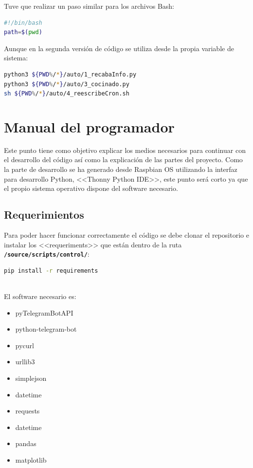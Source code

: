 Tuve que realizar un paso similar para los archivos Bash:
\begin{lstlisting}[language=sh, firstnumber=0, basicstyle=\small, caption={Obtención de rutas en Bash scripting.}]
#!/bin/bash
path=$(pwd)
\end{lstlisting}
Aunque en la segunda versión de código se utiliza desde la propia variable de sistema:

\begin{lstlisting}[language=sh, firstnumber=0, basicstyle=\small, caption={Utilización de las variables de sistema en Bash.}]
python3 ${PWD%/*}/auto/1_recabaInfo.py
python3 ${PWD%/*}/auto/3_cocinado.py
sh ${PWD%/*}/auto/4_reescribeCron.sh
\end{lstlisting}

\section{Manual del programador}
Este punto tiene como objetivo explicar los medios necesarios para continuar con el desarrollo del código así como la explicación de las partes del proyecto.
Como la parte de desarrollo se ha generado desde Raspbian OS utilizando la interfaz para desarrollo Python, <<Thonny Python IDE>>, este punto será corto ya que el propio sistema operativo dispone del software necesario.

\subsection{Requerimientos}
Para poder hacer funcionar correctamente el código se debe clonar el repositorio e instalar los <<requeriments>> que están dentro de la ruta \texttt{\textbf{/source/scripts/control/}}:
\begin{lstlisting}[language=sh, firstnumber=0, basicstyle=\normalsize, caption={Comando para instalar las librerías neceasrias.}]
pip install -r requirements
\end{lstlisting}~\\

El software necesario es:
\begin{itemize}
    \item pyTelegramBotAPI
    \item python-telegram-bot
    \item pycurl
    \item urllib3
    \item simplejson
    \item datetime
    \item requests
    \item datetime
    \item pandas
    \item matplotlib
\end{itemize}

